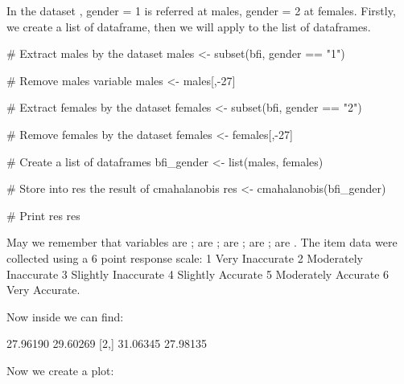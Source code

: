 \documentclass[article]{jss}
\begin{document}
In the dataset , gender = 1 is referred at males, gender = 2 at females. Firstly, we create a list of dataframe, then we will apply  to the list of dataframes.
\begin{CodeChunk}
\begin{CodeInput}
# Extract males by the dataset
males <- subset(bfi, gender == "1") 

# Remove males variable
males <- males[,-27]

# Extract females by the dataset
females <- subset(bfi, gender == "2")

# Remove females by the dataset
females <- females[,-27]

# Create a list of dataframes
bfi_gender <- list(males, females)

# Store into res the result of cmahalanobis
res <- cmahalanobis(bfi_gender)

# Print res
res
\end{CodeInput}
\end{CodeChunk}

May we remember that variables  are ;  are ;  are ;  are ;  are .
The item data were collected using a 6 point response scale: 1 Very Inaccurate 2 Moderately Inaccurate 3 Slightly Inaccurate 4 Slightly Accurate 5 Moderately Accurate 6 Very Accurate.


Now inside  we can find:
\begin{Code}
         [,1]     [,2]
[1,] 27.96190 29.60269
[2,] 31.06345 27.98135
\end{Code}
Now we create a plot:

\begin{CodeChunk}
\end{CodeChunk}
\end{document}
